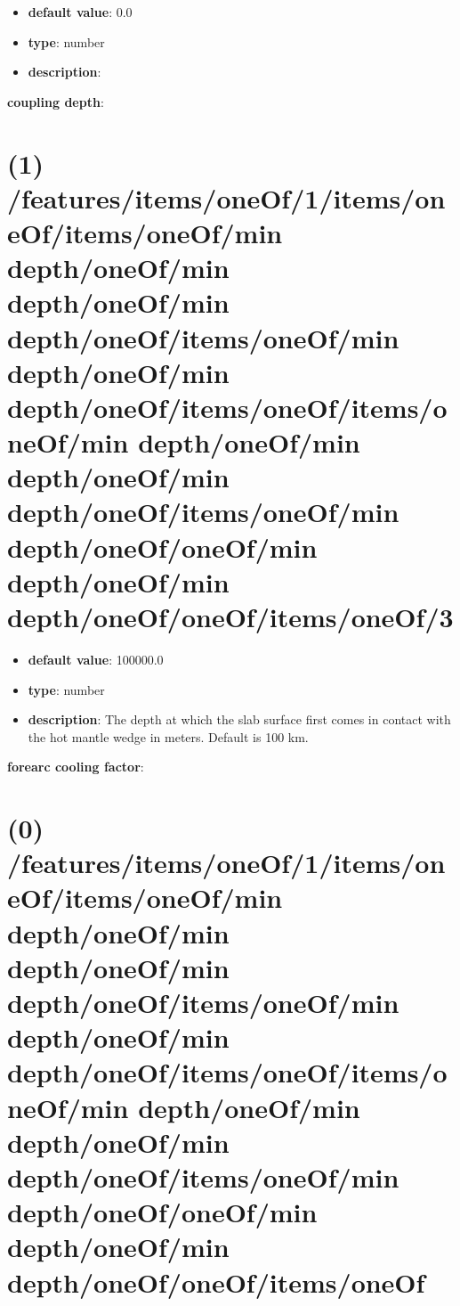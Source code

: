 \begin{itemize}[leftmargin=5em]\item {\bf default value}: 0.0
\item {\bf type}: number
\item {\bf description}: 
\end{itemize}\item {\bf coupling depth}: \section{(1) /features/items/oneOf/1/items/oneOf/items/oneOf/min depth/oneOf/min depth/oneOf/min depth/oneOf/items/oneOf/min depth/oneOf/min depth/oneOf/items/oneOf/items/oneOf/min depth/oneOf/min depth/oneOf/min depth/oneOf/items/oneOf/min depth/oneOf/oneOf/min depth/oneOf/min depth/oneOf/oneOf/items/oneOf/3}
\begin{itemize}[leftmargin=1em]\item {\bf default value}: 100000.0
\item {\bf type}: number
\item {\bf description}: The depth at which the slab surface first comes in contact with the hot mantle wedge in meters. Default is 100 km.
\end{itemize}\item {\bf forearc cooling factor}: \section{(0) /features/items/oneOf/1/items/oneOf/items/oneOf/min depth/oneOf/min depth/oneOf/min depth/oneOf/items/oneOf/min depth/oneOf/min depth/oneOf/items/oneOf/items/oneOf/min depth/oneOf/min depth/oneOf/min depth/oneOf/items/oneOf/min depth/oneOf/oneOf/min depth/oneOf/min depth/oneOf/oneOf/items/oneOf}

